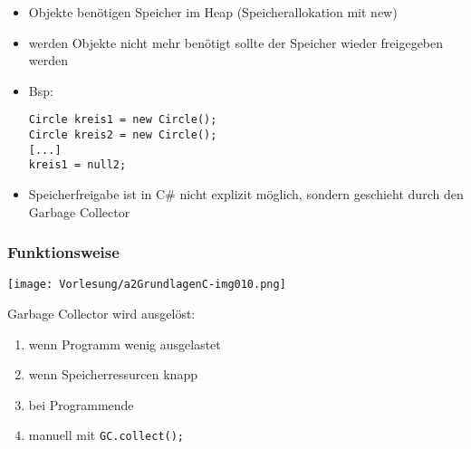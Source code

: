\begin{itemize}
\item Objekte benötigen Speicher im Heap (Speicherallokation mit new)
\item werden Objekte nicht mehr benötigt sollte der Speicher wieder freigegeben werden
\item Bsp: 
\begin{lstlisting}[language={[Sharp]C}]
Circle kreis1 = new Circle();
Circle kreis2 = new Circle();
[...]
kreis1 = null2;
\end{lstlisting}
\item Speicherfreigabe ist in C\# nicht explizit möglich, sondern geschieht durch den Garbage Collector
\end{itemize}

\subsubsection*{Funktionsweise}
\begin{center}
\texttt{[image: Vorlesung/a2GrundlagenC-img010.png]}
\end{center}
Garbage Collector wird ausgelöst:
\begin{enumerate}
\item wenn Programm wenig ausgelastet
\item wenn Speicherressurcen knapp
\item bei Programmende
\item manuell mit \lstinline$GC.collect();$
\end{enumerate}